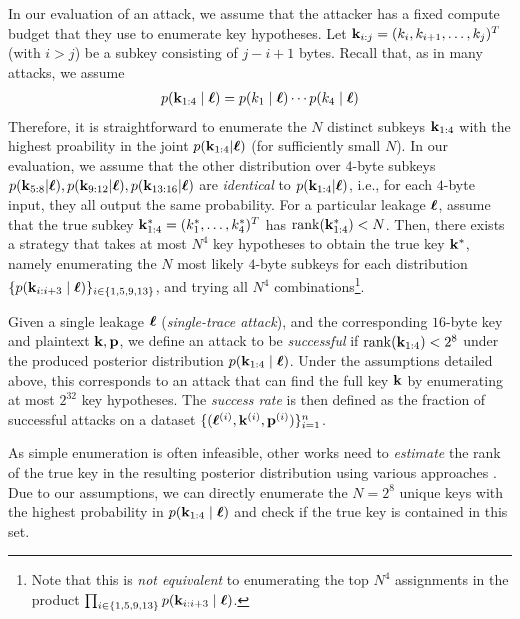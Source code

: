 In our evaluation of an attack, we assume that the attacker has a fixed compute budget that they use to enumerate key hypotheses. Let $\mathbf{k}_{i:j} = (k_i, k_{i+1}, \dots, k_j)^T$ (with $i > j$) be a subkey consisting of $j - i + 1$ bytes.
Recall that, as in many attacks, we assume 
    \begin{align}
        p(\mathbf{k}_{1:4} \mid \boldsymbol{\ell}) = p(k_1 \mid \boldsymbol{\ell}) \cdots p(k_4 \mid \boldsymbol{\ell})
    \end{align}
Therefore, it is straightforward to enumerate the $N$ distinct subkeys $\mathbf{k}_{1:4}$ with the highest proability in the joint $p(\mathbf{k}_{1:4} | \boldsymbol{\ell})$ (for sufficiently small $N$). In our evaluation, we assume that the other distribution over $4$-byte subkeys $p(\mathbf{k}_{5:8} | \boldsymbol{\ell}), p(\mathbf{k}_{9:12} | \boldsymbol{\ell}), p(\mathbf{k}_{13:16} | \boldsymbol{\ell})$ are \emph{identical} to $p(\mathbf{k}_{1:4} | \boldsymbol{\ell})$, i.e., for each $4$-byte input, they all output the same probability.
For a particular leakage $\boldsymbol{\ell}$, assume that the true subkey $\mathbf{k}^*_{1:4} = (k^*_1,\dots,k^*_4)^T$ has $\operatorname{rank}(\mathbf{k}^*_{1:4}) < N$. Then, there exists a strategy that takes at most $N^4$ key hypotheses to obtain the true key $\mathbf{k}^*$, namely enumerating the $N$ most likely $4$-byte subkeys for each distribution $\{ p(\mathbf{k}_{i:i+3} \mid \boldsymbol{\ell}) \}_{i \in \{1,5,9,13\}}$, and trying all $N^4$ combinations\footnote{Note that this is \emph{not equivalent} to enumerating the top $N^4$ assignments in the product $\prod_{i \in \{1,5,9,13\}} p(\mathbf{k}_{i:i+3} \mid \boldsymbol{\ell})$.}.

\begin{definition}
    Given a single leakage $\boldsymbol{\ell}$ (\emph{single-trace attack}), and the corresponding $16$-byte key and plaintext $\mathbf{k}, \mathbf{p}$, we define an attack to be \emph{successful} if $\operatorname{rank}(\mathbf{k}_{1:4}) < 2^8$ under the produced posterior distribution $p(\mathbf{k}_{1:4} \mid \boldsymbol{\ell})$. Under the assumptions detailed above, this corresponds to an attack that can find the full key $\mathbf{k}$ by enumerating at most $2^{32}$ key hypotheses. The \emph{success rate} is then defined as the fraction of successful attacks on a dataset $\{(\boldsymbol{\ell}^{(i)}, \mathbf{k}^{(i)}, \mathbf{p}^{(i)})\}_{i=1}^n$.
\end{definition}

As simple enumeration is often infeasible, other works \cite{32bit, 5min} need to \emph{estimate} the rank of the true key in the resulting posterior distribution using various approaches \cite{key_enumeration, study_key_enum}. Due to our assumptions, we can directly enumerate the $N=2^8$ unique keys with the highest probability in $p(\mathbf{k}_{1:4} \mid \boldsymbol{\ell})$ and check if the true key is contained in this set.

